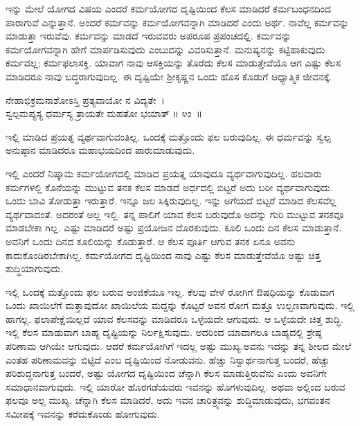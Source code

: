 ಇನ್ನು ಮೇಲೆ ಯೋಗದ ವಿಷಯ ಎಂದರೆ ಕರ್ಮಯೋಗದ ದೃಷ್ಟಿಯಿಂದ ಕೆಲಸ ಮಾಡಿದರೆ ಕರ್ಮಬಂಧನದಿಂದ ಪಾರಾಗುವೆ ಎನ್ನುತ್ತಾನೆ. ಅಂದರೆ ಕರ್ಮವನ್ನು ಕರ್ಮಯೋಗವನ್ನಾಗಿ ಮಾಡಿದರೆ ಎಂದು ಅರ್ಥ. ನಾವೆಲ್ಲ ಕರ್ಮವನ್ನು ಮಾಡುತ್ತಾ ಇರುವೆವು. ಕರ್ಮವನ್ನು ಮಾಡದೆ ಇರುವವರು ಅಪರೂಪ ಪ್ರಪಂಚದಲ್ಲಿ. ಕರ್ಮವನ್ನು ಕರ್ಮಯೋಗವನ್ನಾಗಿ ಹೇಗೆ ಮಾರ್ಪಡಿಸುವುದು ಎಂಬುದನ್ನು ವಿವರಿಸುತ್ತಾನೆ. ಮನುಷ್ಯನನ್ನು ಕಟ್ಟಿಹಾಕುವುದು ಕರ್ಮವಲ್ಲ; ಕರ್ಮಫಲಾಸಕ್ತಿ. ಯಾವಾಗ ನಾವು ಆಸಕ್ತಿಯನ್ನು ತೊರೆದು ಕೆಲಸ ಮಾಡುತ್ತೇವೆಯೊ ಆಗ ಎಷ್ಟು ಕೆಲಸ ಮಾಡಿದರೂ ನಾವು ಬದ್ಧರಾಗುವುದಿಲ್ಲ. ಈ ದೃಷ್ಟಿಯೇ ಶ‍್ರೀಕೃಷ್ಣನ ಒಂದು ಹೊಸ ಕೊಡುಗೆ ಆಧ್ಯಾತ್ಮಿಕ ಜೀವನಕ್ಕೆ.

\begin{shloka}
ನೇಹಾಭಿಕ್ರಮನಾಶೋಽಸ್ತಿ ಪ್ರತ್ಯವಾಯೋ ನ ವಿದ್ಯತೇ~।\\ಸ್ವಲ್ಪಮಪ್ಯಸ್ಯ ಧರ್ಮಸ್ಯ ತ್ರಾಯತೇ ಮಹತೋ ಭಯಾತ್ \hfill॥ ೪ಂ~॥
\end{shloka}

\begin{artha}
ಇಲ್ಲಿ ಮಾಡಿದ ಪ್ರಯತ್ನ ವ್ಯರ್ಥವಾಗುವಂತಿಲ್ಲ. ಒಂದಕ್ಕೆ ಮತ್ತೊಂದು ಫಲ ಬರುವುದಿಲ್ಲ. ಈ ಧರ್ಮವನ್ನು ಸ್ವಲ್ಪ ಅನುಷ್ಠಾನ ಮಾಡಿದರೂ ಮಹಾಭಯದಿಂದ ಪಾರುಮಾಡುವುದು.
\end{artha}

ಇಲ್ಲಿ ಎಂದರೆ ನಿಷ್ಕಾಮ ಕರ್ಮಯೋಗದಲ್ಲಿ ಮಾಡಿದ ಪ್ರಯತ್ನ ಯಾವುದೂ ವ್ಯರ್ಥವಾಗುವುದಿಲ್ಲ. ಹಲವಾರು ಕರ್ಮಗಳಲ್ಲಿ ಕೊನೆಯನ್ನು ಮುಟ್ಟುವ ತನಕ ಕೆಲಸ ಮಾಡದೆ ಅರ್ಧದಲ್ಲಿ ಬಿಟ್ಟರೆ ಅದು ಬರೀ ವ್ಯರ್ಥವಾಗುವುದು. ಒಂದು ಬಾವಿ ತೋಡುತ್ತಾ ಇರುತ್ತಾರೆ. ಇನ್ನೂ ಜಲ ಸಿಕ್ಕಿರುವುದಿಲ್ಲ. ಇನ್ನು ಅಗೆಯದೆ ಬಿಟ್ಟರೆ ಮಾಡಿದ ಕೆಲಸವೆಲ್ಲ ವ್ಯರ್ಥವಾದಂತೆ. ಅದರಂತೆ ಅಲ್ಲ ಇಲ್ಲಿ. ತನ್ನ ಪಾಲಿಗೆ ಯಾವ ಕೆಲಸ ಬರುವುದೊ ಅದನ್ನು ಗುರಿ ಮುಟ್ಟುವ ತನಕವೂ ಮಾಡಬೇಕಾ ಗಿಲ್ಲ. ಎಷ್ಟು ಮಾಡಿದರೆ ಅಷ್ಟು ಪ್ರಯೋಜನ ದೊರಕುವುದು. ಕೂಲಿ ಒಂದು ದಿನ ಕೆಲಸ ಮಾಡುತ್ತಾನೆ. ಅವನಿಗೆ ಒಂದು ದಿನದ ಕೂಲಿಯನ್ನು ಕೊಡುತ್ತಾರೆ. ಆ ಕೆಲಸ ಪೂರ್ತಿ ಆಗುವ ತನಕ ಏನೂ ಅವನು ಕಾದುಕೊಂಡಿರಬೇಕಾಗಿಲ್ಲ. ಕರ್ಮಯೋಗದ ದೃಷ್ಟಿಯಿಂದ ನಾವು ಎಷ್ಟು ಕೆಲಸ ಮಾಡುತ್ತೇವೆಯೊ ಅಷ್ಟು ಚಿತ್ತ ಶುದ್ಧಿಯಾಗುವುದು.

ಇಲ್ಲಿ ಒಂದಕ್ಕೆ ಮತ್ತೊಂದು ಫಲ ಬರುವ ಅಂಜಿಕೆಯೂ ಇಲ್ಲ. ಕೆಲವು ವೇಳೆ ರೋಗಿಗೆ ಔಷಧಿಯನ್ನು ಕೊಡುವಾಗ ಒಂದು ಖಾಯಿಲೆಗೆ ಮತ್ತಾವುದೋ ಖಾಯಿಲೆಯ ಮದ್ದನ್ನು ಕೊಟ್ಟರೆ ಅವನ ರೋಗ ಮತ್ತೂ ಉಲ್ಬಣವಾಗುವುದು. ಇಲ್ಲಿ ಹಾಗಲ್ಲ. ಫಲಾಪೇಕ್ಷೆಯಿಲ್ಲದೆ ಯಾವ ಕೆಲಸವನ್ನು ಮಾಡಿದರೂ ಒಳ್ಳೆಯದೇ ಆಗುವುದು. ಆ ಒಳ್ಳೆಯದೇ ಚಿತ್ತ ಶುದ್ಧಿ. ಇಲ್ಲಿ ಕೆಲಸ ಮಾಡುವಾಗ ಬಾಹ್ಯ ದೃಷ್ಟಿಯನ್ನು ನಿರ್ಲಕ್ಷಿಸುವುದು. ಅದರಿಂದ ಯಾವಾಗಲೂ ಬಾಹ್ಯದಲ್ಲಿ ಶ್ರೇಷ್ಠ ಪರಿಣಾಮ ಆಗಿಯೇ ಆಗುವುದು. ಆದರೆ ಕರ್ಮಯೋಗಿಗೆ ಇದಲ್ಲ ಅಷ್ಟು ಮುಖ್ಯ.ಅವನು ಇದನ್ನು ತನ್ನ ಶೀಲದ ಮೇಲೆ ಎಂತಹ ಪರಿಣಾಮವನ್ನು ಬಿಟ್ಟಿದೆ ಎಂಬ ದೃಷ್ಟಿಯಿಂದ ನೋಡುವನು. ಹೆಚ್ಚು ನಿಸ್ವಾರ್ಥನಾಗುತ್ತ ಬಂದರೆ, ಹೆಚ್ಚು ಪರಿಶುದ್ಧನಾಗುತ್ತ ಬಂದರೆ, ಅಷ್ಟು ಯೋಗದ ದೃಷ್ಟಿಯಿಂದ ಚೆನ್ನಾಗಿ ಕೆಲಸ ಮಾಡುತ್ತಿರುವೆನು ಎಂದು ಅವನಿಗೇ ಸಮಾಧಾನವಾಗುವುದು. ಇಲ್ಲಿ ಯಾರೋ ಹೊರಗಡೆಯವರು ಇವನನ್ನು ಹೊಗಳುವುದಿಲ್ಲ. ಅಥವಾ ಅಲ್ಲಿಂದ ಬರುವ ಫಲವೂ ಅಲ್ಲ ಮುಖ್ಯ. ಚೆನ್ನಾಗಿ ಕೆಲಸ ಮಾಡಿದರೆ, ಅದು ಇವನ ಚಾರಿತ್ರ್ಯವನ್ನು ಶುದ್ಧಿಮಾಡುವುದು, ಭಗವಂತನ ಸಮೀಪಕ್ಕೆ ಇವನನ್ನು ಕರೆದುಕೊಂಡು ಹೋಗುವುದು.

